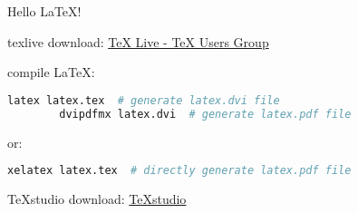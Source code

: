 \documentclass{article}
\begin{document}
    Hello \LaTeX !

    texlive download: \href{https://www.tug.org/texlive/}{TeX Live - TeX Users Group}

    compile \LaTeX :
    \begin{lstlisting}[language=bash]
        latex latex.tex  # generate latex.dvi file
        dvipdfmx latex.dvi  # generate latex.pdf file
    \end{lstlisting}

    or:
    \begin{lstlisting}[language=bash]
        xelatex latex.tex  # directly generate latex.pdf file
    \end{lstlisting}

    TeXstudio download: \href{https://www.texstudio.org/#download}{TeXstudio}
\end{document}
